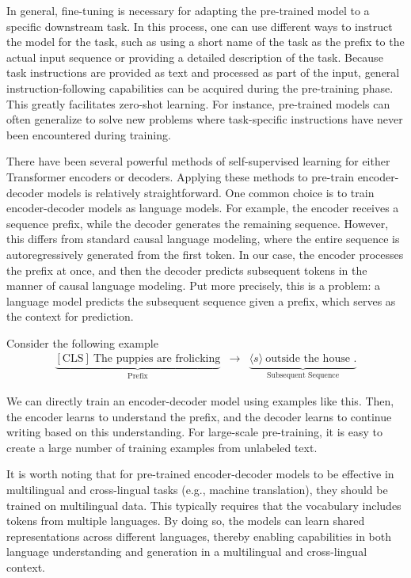 In general, fine-tuning is necessary for adapting the pre-trained model to a specific downstream task. In this process, one can use different ways to instruct the model for the task, such as using a short name of the task as the prefix to the actual input sequence or providing a detailed description of the task. Because task instructions are provided as text and processed as part of the input, general instruction-following capabilities can be acquired during the pre-training phase. This greatly facilitates zero-shot learning. For instance, pre-trained models can often generalize to solve new problems where task-specific instructions have never been encountered during training.

There have been several powerful methods of self-supervised learning for either Transformer encoders or decoders. Applying these methods to pre-train encoder-decoder models is relatively straightforward. One common choice is to train encoder-decoder models as language models. For example, the encoder receives a sequence prefix, while the decoder generates the remaining sequence. However, this differs from standard causal language modeling, where the entire sequence is autoregressively generated from the first token. In our case, the encoder processes the prefix at once, and then the decoder predicts subsequent tokens in the manner of causal language modeling. Put more precisely, this is a  problem: a language model predicts the subsequent sequence given a prefix, which serves as the context for prediction.

Consider the following example
\begin{eqnarray}
\underbrace{\mathrm{[CLS]}\ \textrm{The puppies are frolicking}}_{\textrm{Prefix}} & \to & \underbrace{\langle s \rangle\ \textrm{outside the house .}}_{\textrm{Subsequent Sequence}} \nonumber
\end{eqnarray}

\noindent We can directly train an encoder-decoder model using examples like this. Then, the encoder learns to understand the prefix, and the decoder learns to continue writing based on this understanding. For large-scale pre-training, it is easy to create a large number of training examples from unlabeled text.

It is worth noting that for pre-trained encoder-decoder models to be effective in multilingual and cross-lingual tasks (e.g., machine translation), they should be trained on multilingual data. This typically requires that the vocabulary includes tokens from multiple languages. By doing so, the models can learn shared representations across different languages, thereby enabling capabilities in both language understanding and generation in a multilingual and cross-lingual context.


